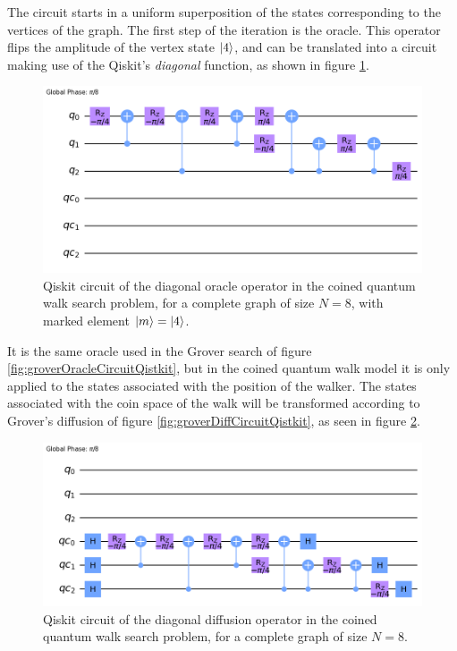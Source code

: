 \documentclass[../../dissertation.tex]{subfiles}
\begin{document}
The circuit starts in a uniform superposition of the states corresponding to
the vertices of the graph. The first step of the iteration is the oracle.
This operator flips the amplitude of the vertex state $\ket{4}$, and can be
translated into a circuit making use of the Qiskit's \textit{diagonal} function, as shown
in figure \ref{fig:coinedQWSearchOracleCircuitQistkit}. 
\begin{figure}[!h]
	\centering
	\includegraphics[scale=0.30]{img/Qiskit/CoinedQuantumWalk/Search/Circuits/CoinedSearchQiskitCircOracle_N3_M4_S5.png}
	\caption{Qiskit circuit of the  diagonal oracle operator in the coined quantum walk search problem, for a complete graph of size $N=8$, with marked element $\ket{m}=\ket{4}$.} 
	\label{fig:coinedQWSearchOracleCircuitQistkit}
\end{figure}
It is the same oracle used in the Grover search of figure
\ref{fig:groverOracleCircuitQistkit}, but in the coined quantum walk model it
is only applied to the states associated with the position of the walker. The
states associated with the coin space of the walk will be transformed according
to Grover's diffusion of figure \ref{fig:groverDiffCircuitQistkit}, as seen
in figure \ref{fig:coinedQWSearchDiffCircuitQistkit}. 
\begin{figure}[!h]
	\centering
	\includegraphics[scale=0.30]{img/Qiskit/CoinedQuantumWalk/Search/Circuits/CoinedSearchQiskitCircDiff_N3_M4_S5.png}
	\caption{Qiskit circuit of the  diagonal diffusion operator in the coined quantum walk search problem, for a complete graph of size $N=8$.} 
	\label{fig:coinedQWSearchDiffCircuitQistkit}
\end{figure}\par
\end{document}
